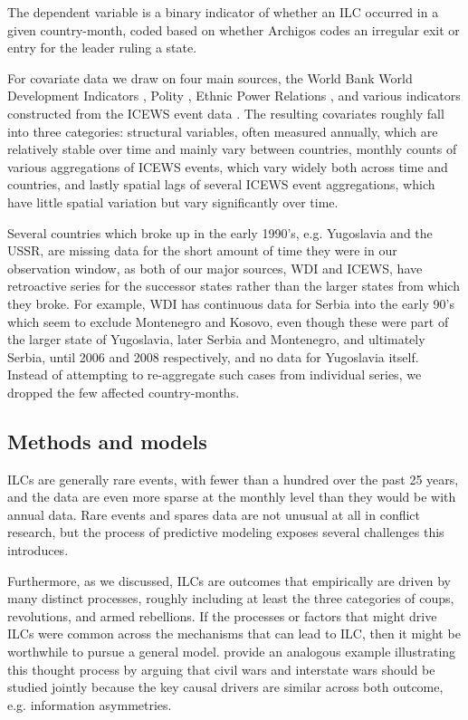 \documentclass[pdftex,11pt]{article}
\begin{document}
The dependent variable is a binary indicator of whether an ILC occurred in a given country-month, coded based on whether Archigos codes an irregular exit or entry for the leader ruling a state.

For covariate data we draw on four main sources, the World Bank World Development Indicators \citep{wdi:2012}, Polity \citep{marshall:jaggers:2002}, Ethnic Power Relations \citep{wimmer:etal:2009}, and various indicators constructed from the ICEWS event data \citep{obrien:2010, ward:etal:2012, icews:2015:data,icews:2015:aggregations}. The resulting covariates roughly fall into three categories: structural variables, often measured annually, which are relatively stable over time and mainly vary between countries, monthly counts of various aggregations of ICEWS events, which vary widely both across time and countries, and lastly spatial lags of several ICEWS event aggregations, which have little spatial variation but vary significantly over time. 

Several countries which broke up in the early 1990's, e.g. Yugoslavia and the USSR, are missing data for the short amount of time they were in our observation window, as both of our major sources, WDI and ICEWS, have retroactive series for the successor states rather than the larger states from which they broke. For example, WDI has continuous data for Serbia into the early 90's which seem to exclude Montenegro and Kosovo, even though these were part of the larger state of Yugoslavia, later Serbia and Montenegro, and ultimately Serbia, until 2006 and 2008 respectively, and no data for Yugoslavia itself. Instead of attempting to re-aggregate such cases from individual series, we dropped the few affected country-months. 

\subsection{Methods and models}

ILCs are generally rare events, with fewer than a hundred over the past 25 years, and the data are even more sparse at the monthly level than they would be with annual data. Rare events and spares data are not unusual at all in conflict research, but the process of predictive modeling exposes several challenges this introduces. 

Furthermore, as we discussed, ILCs are outcomes that empirically are driven by many distinct processes, roughly including at least the three categories of coups, revolutions, and armed rebellions. If the processes or factors that might drive ILCs were common across the mechanisms that can lead to ILC, then it might be worthwhile to pursue a general model. \citet{cunningham:lemke:2013} provide an analogous example illustrating this thought process by arguing that civil wars and interstate wars should be studied jointly because the key causal drivers are similar across both outcome, e.g. information asymmetries. 
\end{document}

